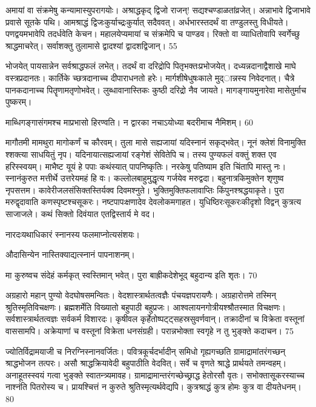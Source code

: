   अमायां वा संक्रमेषु कन्यामास्युपरागयोः।
 अश्राद्धकृद् द्विजो राजन्! सद्यश्चण्डाळतांव्रजेत्।
 अन्नाभावे द्विजाभावे प्रवासे सूतके पथि।
 आमश्राद्धं द्विजःकुर्याच्द्रःकुर्यात् सदैववत्।
 अर्धभारस्तदर्थं वा तण्डुलस्तु विधीयते।
 पणद्वयमभावेपि तदर्धवेति केचन।
 महालयेप्यमायां च संक्रमेपि च पाण्डव।
 रिक्तो वा व्याधितोवापि स्वर्गेच्छु श्राद्धमाचरेत्।
 सर्वाशक्तु तुलामासे द्वादश्यां द्वादशद्विजान्।
 55

  भोजयेत् पायसान्नेन सर्वश्राद्धफलं लभेत्।
 तदर्थं वा दरिद्रोपि पितृभक्तःप्रभोजयेत्।
 दध्यन्नदानाद्वैशाखे माघे वस्त्रप्रदानतः।
 कार्तिके च्छत्रदानाच्च दीपाराधनतो हरेः।
 मार्गशीषेधुषःकाले मुद्ान्नस्य निवेदनात्।
 चैत्रे पानकदानाच्च पितॄणामतृणोभवेत्।
 लुब्धावानास्तिकः कुष्ठी दरिद्रो नैव जायते।
 मागङ्गायमुनारेवा मासेतुर्माच पुष्करम्।
 
माब्धिगङ्गासंगमश्च माप्रभासो हिरण्वति।
 न द्वारका नचाऽयोध्या बदरीमाच नैमिशम्।
 60

  मागौतमी मामथुरा मागोकर्णं च कौरवम्।
 तुला मासे सह्यजायां यदिस्नानं सकृद्भवेत्।
 नूनं क्लेशं विनामुक्ति श्शक्त्या साधयितुं नृप।
 यदिनायात्सह्यजायां रङ्गेशं सेवितेपि च।
 तस्य पुण्यफलं वक्तुं शक्त एव हरिस्स्वयम्।
 माभैष्ट यूयं हे पपाः कथंस्यात् पापनिष्कृतिः।
 नरकेषु पतिष्याम इति चिंतापि मास्तु नः।
 स्नानंकुरुत मत्तीर्थे उत्तरेयमहं हि वः।
 कल्लोलबाहुमुद्धृत्य गर्जयेव मरुद्वदा।
 बहुनात्रकिमुक्तेन शृणुष्व नृपसत्तम।
 कावेरीजलसंसिक्तस्तिर्यक्व दिवमश्नुते।
 भुक्तिमुक्तिफलावाप्तिः किंपुनश्श्रद्धयाकृते।
 पुरा मरुद्वृदावाति कणस्पृष्टश्चसूकरः।
 नष्टपापःक्षणादेव देवलोकमगाहत।
 युधिष्ठिरःसूकरःकीदृशो विद्वन् कुत्रत्य साजाजले।
 कथं सिक्तो दिवंयात एतद्विस्तार्य मे वद।
 
नारदःयथाधिकारं स्नानस्य फलमाप्नोत्यसंशयः।

औदासिन्येन नास्तिक्याद्यत्स्नानं पापनाशनम्।

मा कुरुष्वच संदेहं कर्मकृत् स्वस्तिमान् भवेत्।
 पुरा बाह्रीकदेशेभूद् बहुदान्य इति शृतः।
 70

  अग्रहारो महान् पुण्यो वेदघोषसमन्वितः।
 वेदशास्त्रार्थतत्वज्ञैः पंचयज्ञपरायणैः।
 अग्रहारोत्तमे तस्मिन् श्रुतिस्मृतिविचक्षणः।
 ब्रह्मशर्मेति विख्यातो बहुपाठी बहुप्रजः।
 आश्वलायनगोत्रीयश्श्रौतस्मात विचक्षणः।
 सर्वशास्त्रार्थतत्वज्ञः सर्वकर्म विशारदः।
 कृषीवल कृर्हेतोष्पट्ट्सहस्रसुवर्णवान्।
 तक्रादीनां च विक्रेता वस्तूनां वाससामपि।
 अक्रेयाणां च वस्तूनां विक्रेता धनसंग्रही।
 परान्नभोक्ता स्वगृहे न तु भुङ्क्ते कदाचन।
 75

  ज्योतिर्विद्रामयाजी च निरग्निस्नानवर्जितः।
 पवित्रकूर्चदर्भादीन् समिधो गृह्यगच्छति ग्रामाद्रामांतरंगच्छन् श्राद्धभोजन तत्परः।
 असौ श्राद्धक्रियावेदी बहुपाठीति वेदवित्।
 सर्वे च वृणते श्राद्धे प्रार्थयते तमन्वहम्।
 अनाहूतस्स्वयं गत्वा भुङ्क्ते स्वातन्त्र्यमावह।
 ग्रामाद्रामान्तरंगच्छेच्छ्राद्ध हेतोरसौ वृतः।
 सभोक्तासूकरस्याच्च नाश्नंति पितरोस्य च।
 प्रायश्चित्तं न कुरुते श्रुतिस्मृत्यर्थवेद्यपि।
 कुत्रश्राद्धं कुत्र होमः कुत्र वा दीयतेधनम्।
 80

